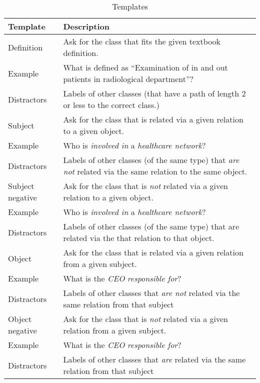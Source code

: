 \documentclass[sw]{iosart2x}
\begin{document}
\begin{table*}
\caption{Templates}
\label{tab:templates}
\begin{tabulary}{\textwidth}{lL}
\toprule
\textbf{Template}	&\textbf{Description}\\
\midrule
Definition		&Ask for the class that fits the given textbook definition.\\
Example			&What is defined as \enquote{Examination of in and out patients in radiological department}?\\
Distractors		&Labels of other classes (that have a path of length 2 or less to the correct class.)\\
\midrule
Subject			&Ask for the class that is related via a given relation to a given object.\\
Example			&Who is \emph{involved in} a \emph{healthcare network}?\\
Distractors		&Labels of other classes (of the same type) that \emph{are not} related via the same relation to the same object.\\
\midrule
Subject negative	&Ask for the class that is \emph{not} related via a given relation to a given object.\\
Example			&Who is \emph{involved in} a \emph{healthcare network}?\\
Distractors		&Labels of other classes (of the same type) that are related via the that relation to that object.\\
\midrule
Object			&Ask for the class that is related via a given relation from a given subject.\\ 
Example			&What is the \emph{CEO} \emph{responsible for}?\\
Distractors		&Labels of other classes that \emph{are not} related via the same relation from that subject\\
\midrule
Object negative		&Ask for the class that is \emph{not} related via a given relation from a given subject.\\ 
Example			&What is the \emph{CEO} \emph{responsible for}?\\
Distractors		&Labels of other classes that \emph{are} related via the same relation from that subject\\
\midrule

\end{tabulary}
\end{table*}
\end{document}

